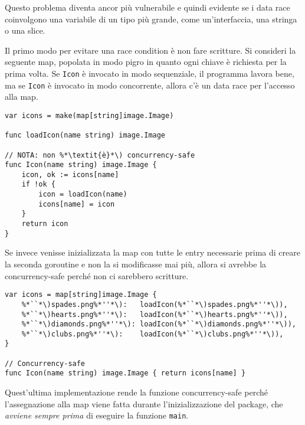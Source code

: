 Questo problema diventa ancor più vulnerabile e quindi evidente se i data race coinvolgono una variabile di un tipo più grande, come un'interfaccia, una stringa o una slice.

Il primo modo per evitare una race condition è non fare scritture.
Si consideri la seguente map, popolata in modo pigro in quanto ogni chiave è richiesta per la prima volta.
Se \verb|Icon| è invocato in modo sequenziale, il programma lavora bene, ma se \verb|Icon| è invocato in modo concorrente, allora c'è un data race per l'accesso alla map.
\begin{lstlisting}[frame=single, label={lst:lstlisting9-1.4}]
var icons = make(map[string]image.Image)

func loadIcon(name string) image.Image

// NOTA: non %*\textit{è}*\) concurrency-safe
func Icon(name string) image.Image {
    icon, ok := icons[name]
    if !ok {
        icon = loadIcon(name)
        icons[name] = icon
    }
    return icon
}
\end{lstlisting}
Se invece venisse inizializzata la map con tutte le entry necessarie prima di creare la seconda goroutine e non la si modificasse mai più, allora si avrebbe la concurrency-safe perché non ci sarebbero scritture.
\begin{lstlisting}[frame=single, label={lst:lstlisting9-1.5}]
var icons = map[string]image.Image {
    %*``*\)spades.png%*''*\):   loadIcon(%*``*\)spades.png%*''*\)),
    %*``*\)hearts.png%*''*\):   loadIcon(%*``*\)hearts.png%*''*\)),
    %*``*\)diamonds.png%*''*\): loadIcon(%*``*\)diamonds.png%*''*\)),
    %*``*\)clubs.png%*''*\):    loadIcon(%*``*\)clubs.png%*''*\)),
}

// Concurrency-safe
func Icon(name string) image.Image { return icons[name] }
\end{lstlisting}
Quest'ultima implementazione rende la funzione concurrency-safe perché l'assegnazione alla map viene fatta durante l'inizializzazione del package, che \textit{avviene sempre prima} di eseguire la funzione \verb|main|.

